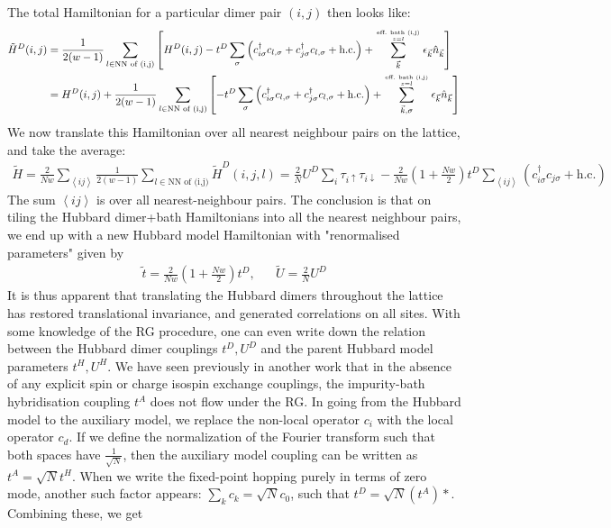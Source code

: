 \documentclass{report}
\numberwithin{equation}{section}
\begin{document}
The total  Hamiltonian for a particular dimer pair \((i,j)\) then looks like:
\begin{equation}\begin{aligned}
	\tilde H^D(i, j) &= \frac{1}{2(w-1)}\sum_{l \in \text{NN of (i,j)}} \left[H^D(i, j) - t^D \sum_{\sigma}\left(c^\dagger_{i\sigma}c_{l,\sigma} + c^\dagger_{j\sigma}c_{l,\sigma} + \text{h.c.}\right) + \sum_{\vec k}^{\text{eff. bath (i,j)}\atop{z = l}}\epsilon_{\vec k}\hat n_{\vec k}\right]\\
			 &= H^D(i, j) + \frac{1}{2(w-1)}\sum_{l \in \text{NN of (i,j)}}\left[- t^D \sum_\sigma\left(c^\dagger_{i\sigma}c_{l,\sigma} + c^\dagger_{j\sigma}c_{l,\sigma} + \text{h.c.}\right) + \sum_{\vec k,\sigma}^{\text{eff. bath (i,j)}\atop{z = l}}\epsilon_{\vec k}\hat n_{\vec k}\right]
\end{aligned}\end{equation}
We now translate this Hamiltonian over all nearest neighbour pairs on the lattice, and take the average:
\begin{equation}\begin{aligned}
	\label{H_tiled}
	\tilde H = \frac{2}{Nw}\sum_{\left<ij\right>}\frac{1}{2(w-1)}\sum_{l \in \text{NN of (i,j)}}\tilde H^D(i, j, l) = \frac{2}{N}U^D\sum_{i} \tau_{i \uparrow}\tau_{i \downarrow} - \frac{2}{Nw}\left(1 + \frac{Nw}{2}\right)t^D\sum_{\left<ij\right>}\left(c^\dagger_{i\sigma}c_{j\sigma} + \text{h.c.}\right)
\end{aligned}\end{equation}
The sum $\left<ij\right>$ is over all nearest-neighbour pairs. 
The conclusion is that on tiling the Hubbard dimer+bath Hamiltonians into all the nearest neighbour pairs, we end up with a new Hubbard model Hamiltonian with "renormalised parameters" given by
\begin{equation}\begin{aligned}
	\tilde t = \frac{2}{Nw}(1 + \frac{Nw}{2})t^D, &&\tilde U = \frac{2}{N}U^D
\end{aligned}\end{equation}
It is thus apparent that translating the Hubbard dimers throughout the lattice has restored translational invariance, and generated correlations on all sites. 
With some knowledge of the RG procedure, one can even write down the relation between the Hubbard dimer couplings $t^D, U^D$ and the parent Hubbard model parameters $t^H, U^H$. We have seen previously in another work that in the absence of any explicit spin or charge isospin exchange couplings, the impurity-bath hybridisation coupling $t^A$ does not flow under the RG. In going from the Hubbard model to the auxiliary model, we replace the non-local operator $c_i$ with the local operator $c_d$. If we define the normalization of the Fourier transform such that both spaces have $\frac{1}{\sqrt N}$, then the auxiliary model coupling can be written as $t^A = \sqrt N t^H$. When we write the fixed-point hopping purely in terms of zero mode, another such factor appears: $\sum_k c_k = \sqrt N c_0$, such that $t^D = \sqrt N (t^A)*$. Combining these, we get
\end{document}
